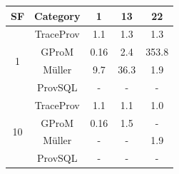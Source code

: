 \begin{tabular}{|c|c|c|c|c|}
\hline
SF & Category & 1 & 13 & 22 \\  
 \hline 
 \multirow{4}{*}{1} & TraceProv & 1.1 & 1.3 & 1.3 \\  
 \cline{2-5} 
  & GProM & 0.16 & 2.4 & 353.8 \\  
 \cline{2-5} 
  & Müller & 9.7 & 36.3 & 1.9 \\  
 \cline{2-5} 
  & ProvSQL & - & - & - \\  
 \hline 
 \multirow{4}{*}{10} & TraceProv & 1.1 & 1.1 & 1.0 \\  
 \cline{2-5} 
  & GProM & 0.16 & 1.5 & - \\  
 \cline{2-5} 
  & Müller & - & - & 1.9 \\  
 \cline{2-5} 
  & ProvSQL & - & - & - \\ 
\hline
\end{tabular}